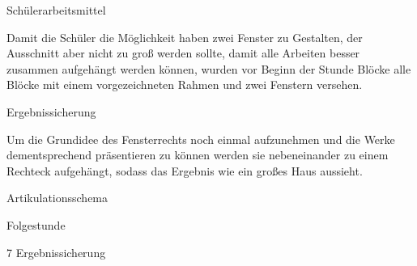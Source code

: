 Schülerarbeitsmittel

Damit die Schüler die Möglichkeit haben zwei Fenster zu Gestalten, der Ausschnitt aber nicht zu groß werden sollte, damit alle Arbeiten besser zusammen aufgehängt werden können, wurden vor Beginn der Stunde  Blöcke alle Blöcke mit einem vorgezeichneten Rahmen und zwei Fenstern versehen.

Ergebnissicherung

Um die Grundidee des Fensterrechts noch einmal aufzunehmen und die Werke dementsprechend präsentieren zu können werden sie nebeneinander zu einem Rechteck aufgehängt, sodass das Ergebnis wie ein großes Haus aussieht.

Artikulationsschema




Folgestunde



7 Ergebnissicherung

